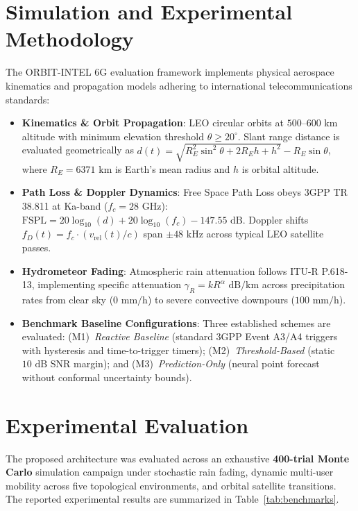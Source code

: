 \documentclass[a4paper]{article}
\begin{document}
\section{Simulation and Experimental Methodology}
The ORBIT-INTEL 6G evaluation framework implements physical aerospace kinematics and propagation models adhering to international telecommunications standards:
\begin{itemize}\setlength{\itemsep}{1.2pt}\setlength{\parskip}{0pt}
  \item \textbf{Kinematics \& Orbit Propagation}: LEO circular orbits at $500\text{--}600\text{ km}$ altitude with minimum elevation threshold $\theta \ge 20^\circ$. Slant range distance is evaluated geometrically as $d(t) = \sqrt{R_E^2 \sin^2\theta + 2 R_E h + h^2} - R_E \sin\theta$, where $R_E = 6371\text{ km}$ is Earth's mean radius and $h$ is orbital altitude.
  \item \textbf{Path Loss \& Doppler Dynamics}: Free Space Path Loss obeys 3GPP TR 38.811 at Ka-band ($f_c = 28\text{ GHz}$): $\text{FSPL} = 20\log_{10}(d) + 20\log_{10}(f_c) - 147.55\text{ dB}$. Doppler shifts $f_D(t) = f_c \cdot (v_{\text{rel}}(t) / c)$ span $\pm 48\text{ kHz}$ across typical LEO satellite passes.
  \item \textbf{Hydrometeor Fading}: Atmospheric rain attenuation follows ITU-R P.618-13, implementing specific attenuation $\gamma_R = k R^\alpha\text{ dB/km}$ across precipitation rates from clear sky ($0\text{ mm/h}$) to severe convective downpours ($100\text{ mm/h}$).
  \item \textbf{Benchmark Baseline Configurations}: Three established schemes are evaluated: (M1)~\textit{Reactive Baseline} (standard 3GPP Event A3/A4 triggers with hysteresis and time-to-trigger timers); (M2)~\textit{Threshold-Based} (static $10\text{ dB}$ SNR margin); and (M3)~\textit{Prediction-Only} (neural point forecast without conformal uncertainty bounds).
\end{itemize}

\section{Experimental Evaluation}
The proposed architecture was evaluated across an exhaustive \textbf{400-trial Monte Carlo} simulation campaign under stochastic rain fading, dynamic multi-user mobility across five topological environments, and orbital satellite transitions. The reported experimental results are summarized in Table~\ref{tab:benchmarks}.
\end{document}
